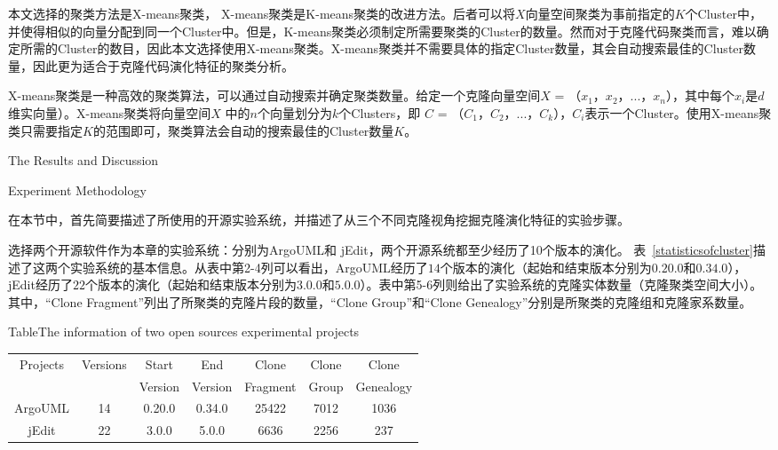 本文选择的聚类方法是X-means聚类\cite{pelleg2000x}， X-means聚类是K-means聚类\cite{arthur2007k}的改进方法。后者可以将$X$向量空间聚类为事前指定的$K$个Cluster中，并使得相似的向量分配到同一个Cluster中。但是，K-means聚类必须制定所需要聚类的Cluster的数量。然而对于克隆代码聚类而言，难以确定所需的Cluster的数目，因此本文选择使用X-means聚类。X-means聚类并不需要具体的指定Cluster数量，其会自动搜索最佳的Cluster数量，因此更为适合于克隆代码演化特征的聚类分析。

X-means聚类是一种高效的聚类算法，可以通过自动搜索并确定聚类数量\cite{pelleg2000x}。给定一个克隆向量空间$X$ = {（$x_1$，$x_2$，$...$，$x_n$）}，其中每个$x_i$是$d$维实向量）。X-means聚类将向量空间$X$ 中的$n$个向量划分为$k$个Clusters，即 $C$ = {（$C_1$，$C_2$，$...$，$C_k$）}，$C_i$表示一个Cluster。使用X-means聚类只需要指定$K$的范围即可，聚类算法会自动的搜索最佳的Cluster数量$K$。

{The Results and Discussion}

{Experiment Methodology}

在本节中，首先简要描述了所使用的开源实验系统，并描述了从三个不同克隆视角挖掘克隆演化特征的实验步骤。

选择两个开源软件作为本章的实验系统：分别为{ArgoUML}和{ jEdit}，两个开源系统都至少经历了10个版本的演化。%
表~\ref{statisticsofcluster}描述了这两个实验系统的基本信息。从表中第2-4列可以看出，{ArgoUML}经历了$14 $个版本的演化（起始和结束版本分别为$0.20.0$和$0.34.0$），{ jEdit}经历了$22$个版本的演化（起始和结束版本分别为$3.0.0$和$5.0.0$）。表中第5-6列则给出了实验系统的克隆实体数量（克隆聚类空间大小）。其中，“Clone Fragment”列出了所聚类的克隆片段的数量，“Clone Group”和“Clone Genealogy”分别是所聚类的克隆组和克隆家系数量。

\begin{table}[htbp]
{Table$\!$}{The information of two open sources experimental projects }
\vspace{0.5em}
\centering 
\wuhao
\begin{tabular}{ccccccc}
\toprule[1.5pt ]
\multirow{2}{*}{Projects}&\multirow{2}{*}{Versions}&Start&End&Clone&Clone&Clone\\ 
&&Version&Version&Fragment&Group&Genealogy\\
\midrule[1pt]
ArgoUML&14&0.20.0&0.34.0&25422&7012&1036\\ 
jEdit&22&3.0.0&5.0.0&6636&2256	&237\\ 
\bottomrule[1.5pt]
\end{tabular}
\end{table}

